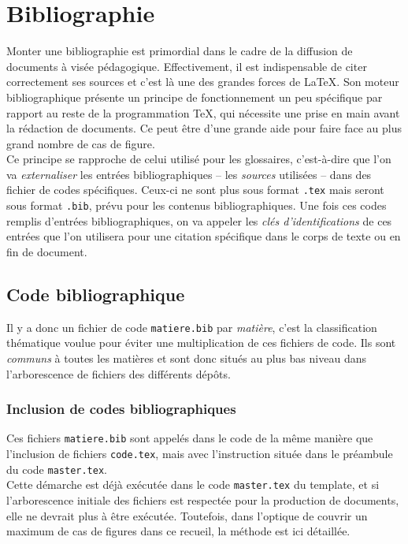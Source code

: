 \documentclass[a4paper, 11pt, twoside, fleqn]{memoir}
\begin{document}
	\section{Bibliographie\label{sec:bibliographie}}

Monter une bibliographie est primordial dans le cadre de la diffusion de documents à visée pédagogique. Effectivement, il est indispensable de citer correctement ses sources et c'est là une des grandes forces de \LaTeX{}. Son moteur bibliographique présente un principe de fonctionnement un peu spécifique par rapport au reste de la programmation \TeX{}, qui nécessite une prise en main avant la rédaction de documents. Ce  peut être d'une grande aide pour faire face au plus grand nombre de cas de figure.\\
	
Ce principe se rapproche de celui utilisé pour les glossaires, c'est-à-dire que l'on va \emph{externaliser} les entrées bibliographiques -- les \emph{sources} utilisées -- dans des fichier de codes spécifiques. Ceux-ci ne sont plus sous format \texttt{.tex} mais seront sous format \texttt{.bib}, prévu pour les contenus bibliographiques. Une fois ces codes remplis d'entrées bibliographiques, on va appeler les \emph{clés d'identifications} de ces entrées que l'on utilisera pour une citation spécifique dans le corps de texte ou en fin de document.

		\subsection{Code bibliographique}

Il y a donc un fichier de code \texttt{matiere.bib} par \emph{matière}, c'est la classification thématique voulue pour éviter une multiplication de ces fichiers de code. Ils sont \emph{communs} à toutes les matières et sont donc situés au plus bas niveau dans l'arborescence de fichiers des différents dépôts.\\

			\subsubsection{Inclusion de codes bibliographiques }

Ces fichiers \texttt{matiere.bib} sont appelés dans le code de la même manière que l'inclusion de fichiers \texttt{code.tex}, mais avec l'instruction \texttt{} située dans le préambule du code \texttt{master.tex}.\\
Cette démarche est déjà exécutée dans le code \texttt{master.tex} du template, et si l'arborescence initiale des fichiers est respectée pour la production de documents, elle ne devrait plus à être exécutée. Toutefois, dans l'optique de couvrir un maximum de cas de figures dans ce recueil, la méthode est ici détaillée.\\
\end{document}
